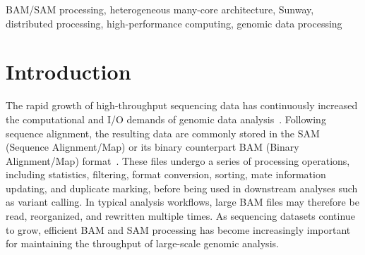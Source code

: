 \documentclass[lettersize,journal]{IEEEtran}
\begin{document}
\begin{abstract}
The SWBAM BAM I/O library achieves 90\%--96\% parallel efficiency across three human and mouse sequencing datasets when scaling from 1 to 12 CGs, measured over the processing interval excluding MPI initialization and finalization.
Compared with SAMtools on a 128-core x86 server, SWBAM using six CGs on a single Sunway node achieves end-to-end speedups of 1.03--4.61$\times$ and 1.33--3.32$\times$ for these two classes of operations, respectively, and 2.27--2.70$\times$ for the complete deduplication workflow.
SWBAM is freely available at \url{https://github.com/WWWZZSS/SWBAM}.
\end{abstract}

\begin{IEEEkeywords}
BAM/SAM processing, heterogeneous many-core architecture, Sunway, distributed processing, high-performance computing, genomic data processing
\end{IEEEkeywords}

\section{Introduction}
The rapid growth of high-throughput sequencing data has continuously increased the computational and I/O demands of genomic data analysis~\cite{amarasinghe2020opportunities,goodwin2016coming,schmidt2017ngs}. Following sequence alignment, the resulting data are commonly stored in the SAM (Sequence Alignment/Map) or its binary counterpart BAM (Binary Alignment/Map) format~\cite{li2009samtools}. 
These files undergo a series of processing operations, including statistics, filtering, format conversion, sorting, mate information updating, and duplicate marking, before being used in downstream analyses such as variant calling. 
In typical analysis workflows, large BAM files may therefore be read, reorganized, and rewritten multiple times. 
As sequencing datasets continue to grow, efficient BAM and SAM processing has become increasingly important for maintaining the throughput of large-scale genomic analysis.
\end{document}
